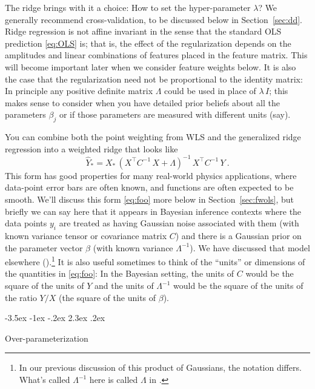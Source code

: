 \documentclass[12pt,letterpaper]{article}
\makeatletter
\renewcommand\section{\@startsection {section}{1}{\z@}%
  {-3.5ex \@plus -1ex \@minus -.2ex}%
  {2.3ex \@plus.2ex}%
  {\raggedright\normalfont\Large\bfseries}}
\newcommand{\sectionname}{Section}
\makeatother
\begin{document}
The ridge brings with it a choice: How to set the hyper-parameter $\lambda$?
We generally recommend cross-validation, to be discussed below in \sectionname~\ref{sec:dd}.
Ridge regression is not affine invariant in the sense that the standard OLS prediction \eqref{eq:OLS} is; that is, the effect of the regularization depends on the amplitudes and linear combinations of features placed in the feature matrix.
This will become important later when we consider feature weights below.
It is also the case that the regularization need not be proportional to the identity matrix: In principle any positive definite matrix $\Lambda$ could be used in place of $\lambda\,I$; this makes sense to consider when you have detailed prior beliefs about all the parameters $\beta_j$ or if those parameters are measured with different units (say).

You can combine both the point weighting from WLS and the generalized ridge regression into a weighted ridge that looks like
\begin{equation}\label{eq:foo}
    \hat{Y}_\ast = X_\ast\,(X^\top C^{-1}\,X + \Lambda)^{-1}\,X^\top C^{-1}\,Y
    ~.
\end{equation}
This form has good properties for many real-world physics applications, where data-point error bars are often known, and functions are often expected to be smooth.
We'll discuss this form \eqref{eq:foo} more below in \sectionname~\ref{sec:fwols},
but briefly we can say here that it appears in Bayesian inference contexts where the data points $y_i$ are treated as having Gaussian noise associated with them (with known variance tensor or covariance matrix $C$) and there is a Gaussian prior on the parameter vector $\beta$ (with known variance $\Lambda^{-1}$).
We have discussed that model elsewhere (\citealt{products}).\footnote{In our previous discussion of this product of Gaussians, the notation differs. What's called $\Lambda^{-1}$ here is called $\Lambda$ in \citet{products}.}
It is also useful sometimes to think of the ``units'' or dimensions of the quantities in \eqref{eq:foo}: In the Bayesian setting, the units of $C$ would be the square of the units of $Y$ and the units of $\Lambda^{-1}$ would be the square of the units of the ratio $Y/X$ (the square of the units of $\beta$).

\section{Over-parameterization}\label{sec:overpar}
\end{document}
